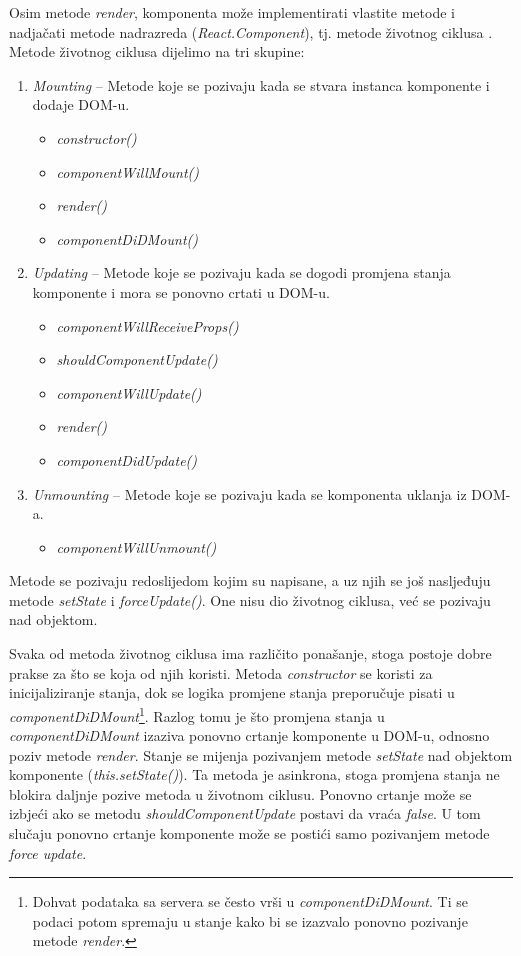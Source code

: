 \documentclass[times, utf8, zavrsni, numeric]{fer}
\newcommand{\razmaks}{\vspace{10pt}}
\begin{document}
Osim metode \emph{render}, komponenta može implementirati vlastite metode i nadjačati metode nadrazreda (\emph{React.Component}), tj. metode životnog ciklusa .
Metode životnog ciklusa dijelimo na tri skupine:
\begin{enumerate}
  \item \emph{Mounting} -- Metode koje se pozivaju kada se stvara instanca komponente i dodaje DOM-u.
  \begin{itemize}
    \item \emph{constructor()}
    \item \emph{componentWillMount()}
    \item \emph{render()}
    \item \emph{componentDiDMount()}
  \end{itemize}
  \item \emph{Updating} -- Metode koje se pozivaju kada se dogodi promjena stanja komponente i mora se ponovno crtati u DOM-u.
  \begin{itemize}
    \item \emph{componentWillReceiveProps()}
    \item \emph{shouldComponentUpdate()}
    \item \emph{componentWillUpdate()}
    \item \emph{render()}
    \item \emph{componentDidUpdate()}
  \end{itemize}
  \item \emph{Unmounting} -- Metode koje se pozivaju kada se komponenta uklanja iz DOM-a.
  \begin{itemize}
    \item \emph{componentWillUnmount()}
  \end{itemize}
\end{enumerate}
\razmaks

Metode se pozivaju redoslijedom kojim su napisane, a uz njih se još nasljeđuju metode \emph{setState}
i \emph{forceUpdate()}.
One nisu dio životnog ciklusa, već se pozivaju nad objektom.

Svaka od metoda životnog ciklusa ima različito ponašanje, stoga postoje dobre prakse za što se koja od njih koristi.
Metoda \emph{constructor} se koristi za inicijaliziranje stanja, dok se logika promjene stanja preporučuje pisati u \emph{componentDiDMount}\footnote{Dohvat podataka sa servera se često vrši u \emph{componentDiDMount}. Ti se podaci potom spremaju u stanje kako bi se izazvalo ponovno pozivanje metode \emph{render}.}.
Razlog tomu je što promjena stanja u \emph{componentDiDMount} izaziva ponovno crtanje komponente u DOM-u, odnosno poziv metode \emph{render}.
Stanje se mijenja pozivanjem metode \emph{setState} nad objektom komponente (\glqq \emph{this.setState()}\grqq ).
Ta metoda je asinkrona, stoga promjena stanja ne blokira daljnje pozive metoda u životnom ciklusu.
Ponovno crtanje može se izbjeći ako se metodu \emph{shouldComponentUpdate} postavi da vraća \emph{false}.
U tom slučaju ponovno crtanje komponente može se postići samo pozivanjem metode \emph{force update}.
\end{document}

